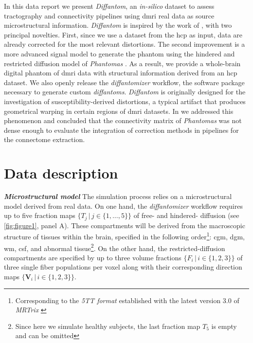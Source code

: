 \documentclass[english]{frontiers/frontiersSCNS} %
\newcommand{\vmaps}{\ensuremath{\{\mathbf{V}_i \,|\, i \in \{1,2,3\}\}}}
\newcommand{\fmaps}{\ensuremath{\{F_i \,|\, i \in \{1,2,3\}\}}}
\newcommand{\tmaps}{\ensuremath{\{T_j \,|\, j \in \{1,\ldots,5\}\}}}
\begin{document}
In this data report we present \emph{Diffantom}, an \emph{in-silico} dataset to assess tractography and connectivity
  pipelines using \gls*{dmri} real data as source microstructural information.
\emph{Diffantom} is inspired by the work of \cite{wilkins_fiber_2014}, with two principal novelties.
First, since we use a dataset from the \gls*{hcp} as input, data are already corrected for the most
  relevant distortions.
The second improvement is a more advanced signal model to generate the phantom using the hindered and restricted
  diffusion model of \emph{Phantomas} \citep{caruyer_phantomas_2014}.
As a result, we provide a whole-brain digital phantom of \gls*{dmri} data with structural information derived
  from an \gls*{hcp} dataset.
We also openly release the \emph{diffantomizer} workflow, the software package necessary to generate custom \emph{diffantoms}.
\emph{Diffantom} is originally designed for the investigation of susceptibility-derived distortions, a
  typical artifact that produces geometrical warping in certain regions of \gls*{dmri} datasets.
In \citep{esteban_simulationbased_2014} we addressed this phenomenon and concluded that the connectivity
  matrix of \emph{Phantomas} was not dense enough to evaluate the integration of correction methods
  in pipelines for the connectome extraction.

\section*{Data description}

\noindent\textbf{\textit{Microstructural model\textcolon}\label{sec:data_model}} %
The simulation process relies on a microstructural model derived from real data.
On one hand, the \emph{diffantomizer} workflow requires up to five fraction maps \tmaps{} of
  free- and hindered- diffusion (see \autoref{fig:figure1}, panel A).
These compartments will be derived from the macroscopic structure of tissues within the brain,
  specified in the following order\footnote{Corresponding to the \emph{5TT format} established
  with the latest version 3.0 of \emph{MRTrix} \citep{tournier_mrtrix_2012}}:
  \gls*{cgm}, \gls*{dgm}, \gls*{wm}, \gls*{csf}, and abnormal tissue\footnote{Since here we
  simulate healthy subjects, the last fraction map $T_5$ is empty and can be omitted}.
On the other hand, the restricted-diffusion compartments are specified by up to three volume fractions \fmaps{}
  of three single fiber populations per voxel along with their corresponding direction maps \vmaps{}.
\end{document}
